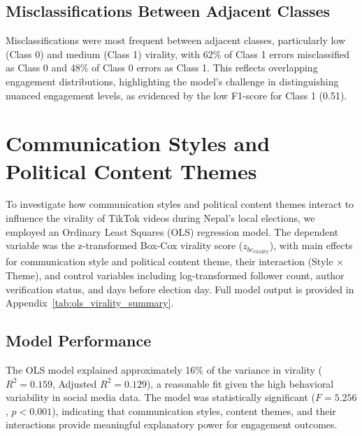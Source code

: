 \documentclass[12pt,a4paper]{report}
\begin{document}
\subsection{Misclassifications Between Adjacent Classes}
Misclassifications were most frequent between adjacent classes, particularly low (Class 0) and medium (Class 1) virality, with 62\% of Class 1 errors misclassified as Class 0 and 48\% of Class 0 errors as Class 1. This reflects overlapping engagement distributions, highlighting the model’s challenge in distinguishing nuanced engagement levels, as evidenced by the low F1-score for Class 1 (0.51).

\section{Communication Styles and Political Content Themes}
To investigate how communication styles and political content themes interact to influence the virality of TikTok videos during Nepal’s local elections, we employed an Ordinary Least Squares (OLS) regression model. The dependent variable was the z-transformed Box-Cox virality score (\( z_{bc_{\text{virality}}} \)), with main effects for communication style and political content theme, their interaction (Style \(\times\) Theme), and control variables including log-transformed follower count, author verification status, and days before election day. Full model output is provided in Appendix~\ref{tab:ols_virality_summary}.

\subsection{Model Performance}
The OLS model explained approximately 16\% of the variance in virality (\( R^2 = 0.159 \), Adjusted \( R^2 = 0.129 \)), a reasonable fit given the high behavioral variability in social media data. The model was statistically significant (\( F = 5.256 \), \( p < 0.001 \)), indicating that communication styles, content themes, and their interactions provide meaningful explanatory power for engagement outcomes.
\end{document}
